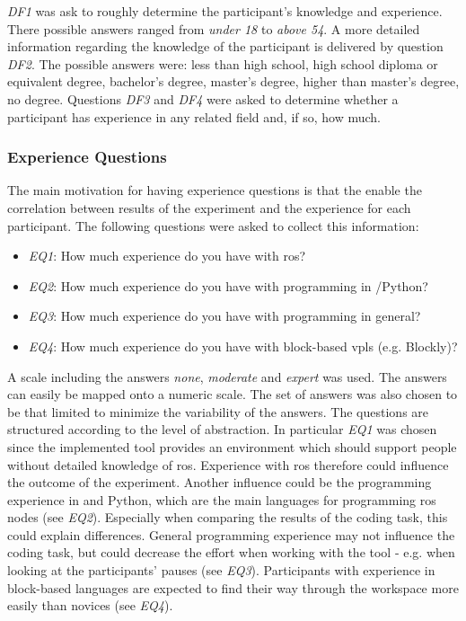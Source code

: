 \textit{DF1} was ask to roughly determine the participant's knowledge and experience. There possible answers ranged from \textit{under 18} to \textit{above 54}. A more detailed information regarding the knowledge of the participant is delivered by question \textit{DF2}. The possible answers were: less than high school, high school diploma or equivalent degree, bachelor's degree, master's degree, higher than master's degree, no degree. Questions \textit{DF3} and \textit{DF4} were asked to determine whether a participant has experience in any related field and, if so, how much.

\subsubsection*{Experience Questions}
The main motivation for having experience questions is that the enable the correlation between results of the experiment and the experience for each participant. The following questions were asked to collect this information:

\begin{itemize}
    \item \textit{EQ1}: How much experience do you have with \gls{ros}?
    \item \textit{EQ2}: How much experience do you have with programming in \Cpp{}/Python?
    \item \textit{EQ3}: How much experience do you have with programming in general?
    \item \textit{EQ4}: How much experience do you have with block-based \glspl{vpl} (e.g. Blockly)?
\end{itemize}

A scale including the answers \textit{none}, \textit{moderate} and \textit{expert} was used. The answers can easily be mapped onto a numeric scale. The set of answers was also chosen to be that limited to minimize the variability of the answers. The questions are structured according to the level of abstraction. In particular \textit{EQ1} was chosen since the implemented tool provides an environment which should support people without detailed knowledge of \gls{ros}. Experience with \gls{ros} therefore could influence the outcome of the experiment. Another influence could be the programming experience in \Cpp{} and Python, which are the main languages for programming \gls{ros} nodes (see \textit{EQ2}). Especially when comparing the results of the coding task, this could explain differences. General programming experience may not influence the coding task, but could decrease the effort when working with the tool - e.g. when looking at the participants' pauses (see \textit{EQ3}). Participants with experience in block-based languages are expected to find their way through the \toolname{} workspace more easily than novices (see \textit{EQ4}).

